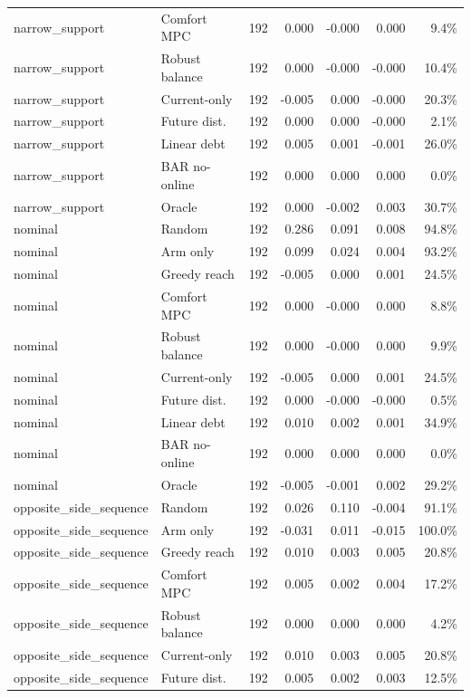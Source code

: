 \begin{longtable}{llrrrrr}
narrow\_support & Comfort MPC & 192 & 0.000 & -0.000 & 0.000 & 9.4\% \\
narrow\_support & Robust balance & 192 & 0.000 & -0.000 & -0.000 & 10.4\% \\
narrow\_support & Current-only & 192 & -0.005 & 0.000 & -0.000 & 20.3\% \\
narrow\_support & Future dist. & 192 & 0.000 & 0.000 & -0.000 & 2.1\% \\
narrow\_support & Linear debt & 192 & 0.005 & 0.001 & -0.001 & 26.0\% \\
narrow\_support & BAR no-online & 192 & 0.000 & 0.000 & 0.000 & 0.0\% \\
narrow\_support & Oracle & 192 & 0.000 & -0.002 & 0.003 & 30.7\% \\
nominal & Random & 192 & 0.286 & 0.091 & 0.008 & 94.8\% \\
nominal & Arm only & 192 & 0.099 & 0.024 & 0.004 & 93.2\% \\
nominal & Greedy reach & 192 & -0.005 & 0.000 & 0.001 & 24.5\% \\
nominal & Comfort MPC & 192 & 0.000 & -0.000 & 0.000 & 8.8\% \\
nominal & Robust balance & 192 & 0.000 & -0.000 & 0.000 & 9.9\% \\
nominal & Current-only & 192 & -0.005 & 0.000 & 0.001 & 24.5\% \\
nominal & Future dist. & 192 & 0.000 & -0.000 & -0.000 & 0.5\% \\
nominal & Linear debt & 192 & 0.010 & 0.002 & 0.001 & 34.9\% \\
nominal & BAR no-online & 192 & 0.000 & 0.000 & 0.000 & 0.0\% \\
nominal & Oracle & 192 & -0.005 & -0.001 & 0.002 & 29.2\% \\
opposite\_side\_sequence & Random & 192 & 0.026 & 0.110 & -0.004 & 91.1\% \\
opposite\_side\_sequence & Arm only & 192 & -0.031 & 0.011 & -0.015 & 100.0\% \\
opposite\_side\_sequence & Greedy reach & 192 & 0.010 & 0.003 & 0.005 & 20.8\% \\
opposite\_side\_sequence & Comfort MPC & 192 & 0.005 & 0.002 & 0.004 & 17.2\% \\
opposite\_side\_sequence & Robust balance & 192 & 0.000 & 0.000 & 0.000 & 4.2\% \\
opposite\_side\_sequence & Current-only & 192 & 0.010 & 0.003 & 0.005 & 20.8\% \\
opposite\_side\_sequence & Future dist. & 192 & 0.005 & 0.002 & 0.003 & 12.5\% \\

\end{longtable}
